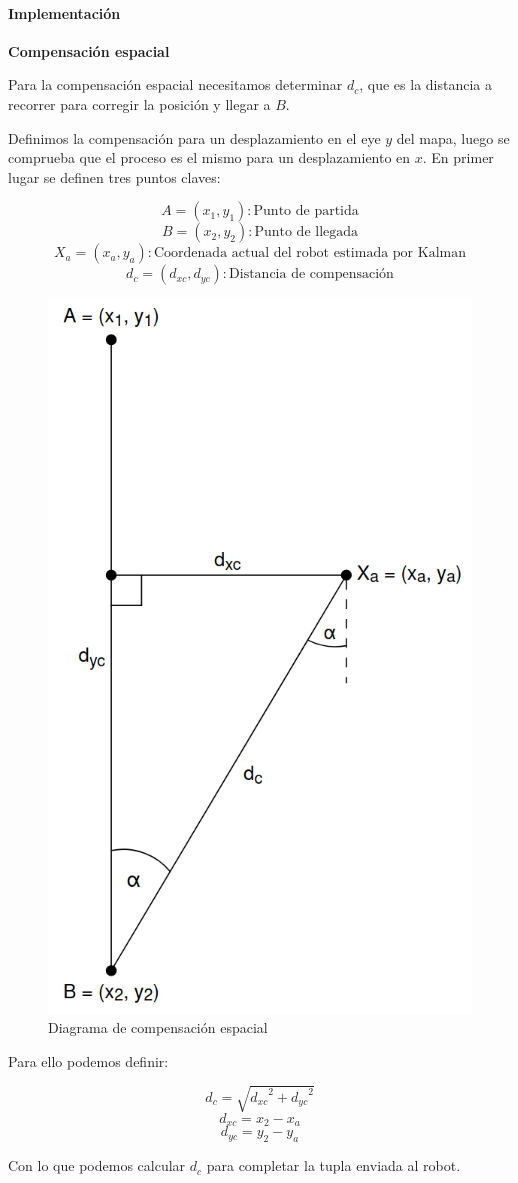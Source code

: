 \paragraph{Implementación} \mbox{} \vspace{8pt}

\textbf{Compensación espacial} \mbox{} \vspace{8pt}

Para la compensación espacial necesitamos determinar $d_c$, que es la distancia a recorrer para corregir la posición y llegar a $B$.

Definimos la compensación para un desplazamiento en el eye $y$ del mapa, luego se comprueba que el proceso es el mismo para un desplazamiento en $x$. En primer lugar se definen tres puntos claves:

$$ A = (x_1, y_1) : \text{Punto de partida} $$
$$ B = (x_2, y_2) : \text{Punto de llegada} $$
$$ X_a = (x_a, y_a) : \text{Coordenada actual del robot estimada por Kalman} $$
$$ d_c = (d_{xc}, d_{yc}) : \text{Distancia de compensación} $$

\begin{figure}[H]
    \centering
    \includegraphics[width=0.4\linewidth]{images/compensacion_vector_distancia_kalman.png}
    \caption{Diagrama de compensación espacial}
    \label{fig:diagcompespacial}
\end{figure}

Para ello podemos definir:

$$ d_c = \sqrt{ {d_{xc}}^2 + {d_{yc}}^2 } $$
$$ d_{xc} = x_2 - x_a $$
$$ d_{yc} = y_2 - y_a $$

Con lo que podemos calcular $d_c$ para completar la tupla enviada al robot.

